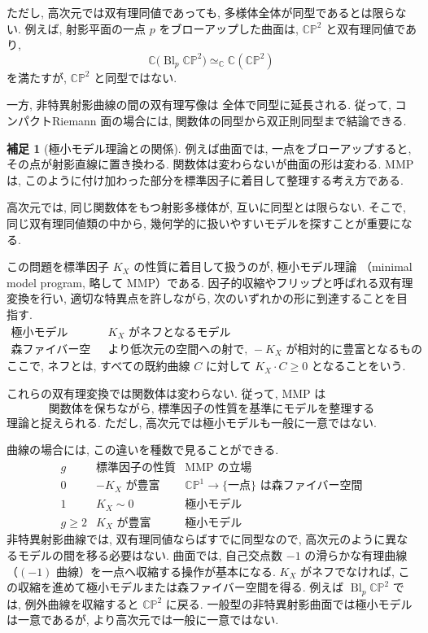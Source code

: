 \documentclass[dvipdfmx,a4paper,11pt]{article} %
\newcommand{\C}{\mathbb{C}}
\theoremstyle{definition}
\numberwithin{equation}{section}
\newtheorem{rem}[thm]{補足}
\begin{document}
ただし, 高次元では双有理同値であっても, 
多様体全体が同型であるとは限らない.
例えば, 射影平面の一点 $p$ をブローアップした曲面は, 
$\C\mathbb P^2$ と双有理同値であり, 
\[
\mathbb C\bigl(\operatorname{Bl}_p\C\mathbb P^2\bigr)
\simeq_{\mathbb C}\mathbb C(\C\mathbb P^2)
\]
を満たすが, $\C\mathbb P^2$ と同型ではない.

一方, 非特異射影曲線の間の双有理写像は
全体で同型に延長される.
従って, コンパクトRiemann 面の場合には, 
関数体の同型から双正則同型まで結論できる.


\begin{rem}[極小モデル理論との関係]\label{rem-mmp}
例えば曲面では, 一点をブローアップすると, その点が射影直線に置き換わる. 関数体は変わらないが曲面の形は変わる. MMP は, このように付け加わった部分を標準因子に着目して整理する考え方である.

高次元では, 同じ関数体をもつ射影多様体が, 
互いに同型とは限らない.
そこで, 同じ双有理同値類の中から, 
幾何学的に扱いやすいモデルを探すことが重要になる.

この問題を標準因子 $K_X$ の性質に着目して扱うのが, 
極小モデル理論
（minimal model program, 略して MMP）である.
因子的収縮やフリップと呼ばれる双有理変換を行い, 
適切な特異点を許しながら, 
次のいずれかの形に到達することを目指す.
\[
\begin{array}{c|l}
\text{極小モデル}
&
K_X\text{ がネフとなるモデル}
\\[3pt]
\text{森ファイバー空間}
&
\text{より低次元の空間への射で, }
-K_X\text{ が相対的に豊富となるもの}
\end{array}
\]
ここで, ネフとは, すべての既約曲線 $C$ に対して
$K_X\cdot C\geq0$ となることをいう.

これらの双有理変換では関数体は変わらない.
従って, MMP は
\[
\boxed{
\text{関数体を保ちながら, 
標準因子の性質を基準にモデルを整理する}
}
\]
理論と捉えられる.
ただし, 高次元では極小モデルも一般に一意ではない.

曲線の場合には, この違いを種数で見ることができる.
\[
\begin{array}{c|c|c}
g & \text{標準因子の性質} & \text{MMP の立場}\\ \hline
0 & -K_X\text{ が豊富}
  & \C\mathbb P^1\to\{\text{一点}\}\text{ は森ファイバー空間}\\[3pt]
1 & K_X\sim0
  & \text{極小モデル}\\[3pt]
g\geq2 & K_X\text{ が豊富}
  & \text{極小モデル}
\end{array}
\]
非特異射影曲線では, 双有理同値ならばすでに同型なので, 
高次元のように異なるモデルの間を移る必要はない.
曲面では, 自己交点数 $-1$ の滑らかな有理曲線（$(-1)$ 曲線）を一点へ収縮する操作が基本になる.
$K_X$ がネフでなければ, この収縮を進めて極小モデルまたは森ファイバー空間を得る.
例えば $\operatorname{Bl}_p\C\mathbb P^2$ では, 例外曲線を収縮すると $\C\mathbb P^2$ に戻る.
一般型の非特異射影曲面では極小モデルは一意であるが, より高次元では一般に一意ではない. 
\end{rem}
\end{document}
